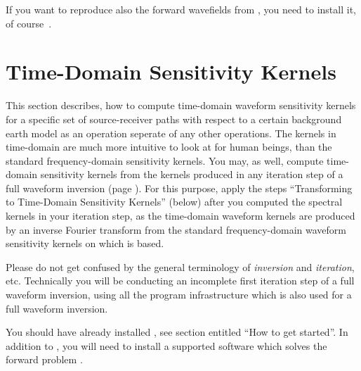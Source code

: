 If you want to reproduce also the forward wavefields from , 
you need to install it, of course~.
%
%
\newpage
\section{Time-Domain Sensitivity Kernels} \label{guide,sec:time_kernels}
%
%
This section describes, how to compute time-domain waveform sensitivity kernels for a specific set 
of source-receiver paths with respect to a certain background earth model as an operation seperate of any
other \ASKI{} operations. The kernels in time-domain are much more intuitive to look at for human beings, 
than the standard frequency-domain sensitivity kernels. You may, as well, compute time-domain sensitivity 
kernels from the kernels produced in any iteration step of a full waveform inversion 
(page \pageref{guide,sec:classic_inversion}). For this purpose, apply the steps 
``Transforming to Time-Domain Sensitivity Kernels'' (below) after you computed the spectral kernels in 
your iteration step, as the time-domain waveform kernels are produced by an inverse Fourier transform 
from the standard frequency-domain waveform sensitivity kernels on which \ASKI{} is based.

Please do not get confused by the general terminology of \emph{inversion} and \emph{iteration}, etc. 
Technically you will be conducting an incomplete first iteration step of a full waveform inversion, 
using all the program infrastructure which is also used for a full waveform inversion. 

You should have already installed \ASKI{}, see section entitled ``How to get started''. 
In addition to \ASKI{}, you will need to install a supported software which 
solves the forward problem .
%

